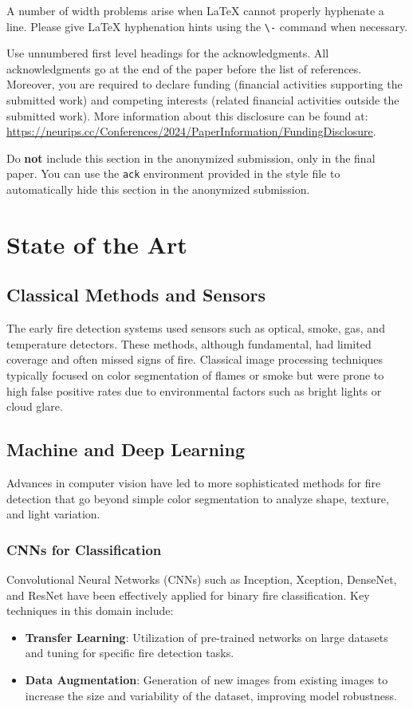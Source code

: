 \documentclass{article}
\begin{document}
A number of width problems arise when \LaTeX{} cannot properly hyphenate a
line. Please give LaTeX hyphenation hints using the \verb+\-+ command when
necessary.

\begin{ack}
Use unnumbered first level headings for the acknowledgments. All acknowledgments
go at the end of the paper before the list of references. Moreover, you are required to declare
funding (financial activities supporting the submitted work) and competing interests (related financial activities outside the submitted work).
More information about this disclosure can be found at: \url{https://neurips.cc/Conferences/2024/PaperInformation/FundingDisclosure}.


Do {\bf not} include this section in the anonymized submission, only in the final paper. You can use the \texttt{ack} environment provided in the style file to automatically hide this section in the anonymized submission.
\end{ack}

\section{State of the Art}

\subsection{Classical Methods and Sensors}
The early fire detection systems used sensors such as optical, smoke, gas, and temperature detectors. These methods, although fundamental, had limited coverage and often missed signs of fire. Classical image processing techniques typically focused on color segmentation of flames or smoke but were prone to high false positive rates due to environmental factors such as bright lights or cloud glare.

\subsection{Machine and Deep Learning}
Advances in computer vision have led to more sophisticated methods for fire detection that go beyond simple color segmentation to analyze shape, texture, and light variation.

\subsubsection{CNNs for Classification}
Convolutional Neural Networks (CNNs) such as Inception, Xception, DenseNet, and ResNet have been effectively applied for binary fire classification. Key techniques in this domain include:
\begin{itemize}
    \item \textbf{Transfer Learning}: Utilization of pre-trained networks on large datasets and tuning for specific fire detection tasks.
    \item \textbf{Data Augmentation}: Generation of new images from existing images to increase the size and variability of the dataset, improving model robustness.
\end{itemize}
\end{document}

